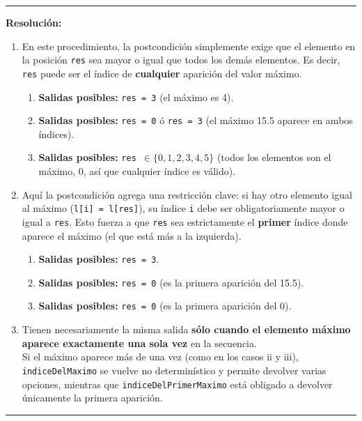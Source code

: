 \vspace{0.2cm}
{\color{gray}\hrule}
\vspace{0.4cm}

\textbf{Resolución:}

\begin{enumerate}[label=\textbf{\alph*)}]
    \item En este procedimiento, la postcondición simplemente exige que el elemento en la posición \texttt{res} sea mayor o igual que todos los demás elementos. Es decir, \texttt{res} puede ser el índice de \textbf{cualquier} aparición del valor máximo.
    \begin{enumerate}[label=\roman*)]
        \item \textbf{Salidas posibles:} \texttt{res = 3} (el máximo es 4).
        \item \textbf{Salidas posibles:} \texttt{res = 0} ó \texttt{res = 3} (el máximo 15.5 aparece en ambos índices).
        \item \textbf{Salidas posibles:} \texttt{res $\in \{0, 1, 2, 3, 4, 5\}$} (todos los elementos son el máximo, 0, así que cualquier índice es válido).
    \end{enumerate}

    \vspace{0.4cm}
    \item Aquí la postcondición agrega una restricción clave: si hay otro elemento igual al máximo (\texttt{l[i] = l[res]}), su índice \texttt{i} debe ser obligatoriamente mayor o igual a \texttt{res}. Esto fuerza a que \texttt{res} sea estrictamente el \textbf{primer} índice donde aparece el máximo (el que está más a la izquierda).
    \begin{enumerate}[label=\roman*)]
        \item \textbf{Salidas posibles:} \texttt{res = 3}.
        \item \textbf{Salidas posibles:} \texttt{res = 0} (es la primera aparición del 15.5).
        \item \textbf{Salidas posibles:} \texttt{res = 0} (es la primera aparición del 0).
    \end{enumerate}

    \vspace{0.4cm}
    \item Tienen necesariamente la misma salida \textbf{sólo cuando el elemento máximo aparece exactamente una sola vez} en la secuencia. \\
    Si el máximo aparece más de una vez (como en los casos ii y iii), \texttt{indiceDelMaximo} se vuelve no determinístico y permite devolver varias opciones, mientras que \texttt{indiceDelPrimerMaximo} está obligado a devolver únicamente la primera aparición.
\end{enumerate}

\vspace{0.5cm}
\hrule
\vspace{0.5cm}